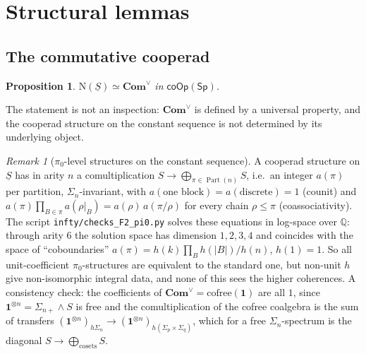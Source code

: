 \documentclass[11pt]{amsart}
\newtheorem{proposition}[subsection]{Proposition}
\theoremstyle{definition}
\theoremstyle{remark}
\newtheorem{remark}[subsection]{Remark}
\newcommand{\Sp}{\mathsf{Sp}}
\newcommand{\coOp}{\mathsf{coOp}}
\newcommand{\uS}{\underline{S}}
\newcommand{\Comv}{\mathbf{Com}^{\vee}}
\newcommand{\unit}{\mathbf{1}}
\newcommand{\Q}{\mathbb{Q}}
\newcommand{\Nfun}{\mathrm{N}}
\newcommand{\Part}{\operatorname{Part}}
\begin{document}
\section{Structural lemmas}\label{sec:lemmas}

\subsection{The commutative cooperad}
\begin{proposition}\label{prop:Com}
$\Nfun(\uS)\simeq\Comv$ in $\coOp(\Sp)$.
\end{proposition}
The statement is not an inspection: $\Comv$ is defined by a universal property, and the cooperad structure on the constant sequence is not determined by its underlying object.

\begin{remark}[$\pi_0$-level structures on the constant sequence]
A cooperad structure on $\uS$ has in arity $n$ a comultiplication $S\to\bigoplus_{\pi\in\Part(n)}S$, i.e.\ an integer $a(\pi)$ per partition, $\Sigma_n$-invariant, with $a(\text{one block})=a(\text{discrete})=1$ (counit) and $a(\pi)\prod_{B\in\pi}a(\rho|_B)=a(\rho)\,a(\pi/\rho)$ for every chain $\rho\leq\pi$ (coassociativity). The script \texttt{infty/checks\_F2\_pi0.py} solves these equations in log-space over $\Q$: through arity $6$ the solution space has dimension $1,2,3,4$ and coincides with the space of ``coboundaries'' $a(\pi)=h(k)\prod_B h(|B|)/h(n)$, $h(1)=1$. So all unit-coefficient $\pi_0$-structures are equivalent to the standard one, but non-unit $h$ give non-isomorphic integral data, and none of this sees the higher coherences. A consistency check: the coefficients of $\Comv=\mathrm{cofree}(\unit)$ are all $1$, since $\unit^{\otimes n}=\Sigma_{n+}\wedge S$ is free and the comultiplication of the cofree coalgebra is the sum of transfers $(\unit^{\otimes n})_{h\Sigma_n}\to(\unit^{\otimes n})_{h(\Sigma_p\times\Sigma_q)}$, which for a free $\Sigma_n$-spectrum is the diagonal $S\to\bigoplus_{\text{cosets}}S$.
\end{remark}
\end{document}
